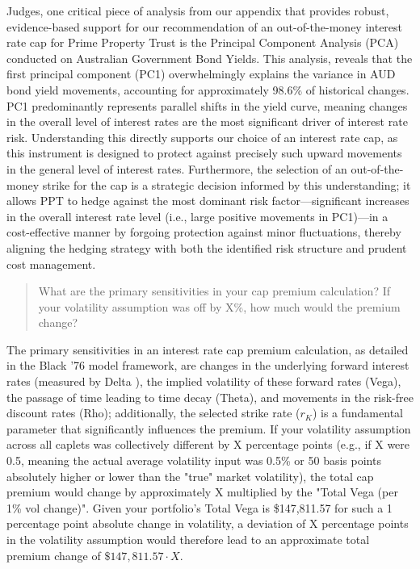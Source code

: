 \documentclass[11pt, a4paper, british]{article}
\begin{document}
Judges, one critical piece of analysis from our appendix that provides robust, evidence-based support for our recommendation of an out-of-the-money interest rate cap for Prime Property Trust is the Principal Component Analysis (PCA) conducted on Australian Government Bond Yields. This analysis, reveals that the first principal component (PC1) overwhelmingly explains the variance in AUD bond yield movements, accounting for approximately 98.6\% of historical changes. PC1 predominantly represents parallel shifts in the yield curve, meaning changes in the overall level of interest rates are the most significant driver of interest rate risk. Understanding this directly supports our choice of an interest rate cap, as this instrument is designed to protect against precisely such upward movements in the general level of interest rates. Furthermore, the selection of an out-of-the-money strike for the cap is a strategic decision informed by this understanding; it allows PPT to hedge against the most dominant risk factor—significant increases in the overall interest rate level (i.e., large positive movements in PC1)—in a cost-effective manner by forgoing protection against minor fluctuations, thereby aligning the hedging strategy with both the identified risk structure and prudent cost management.

\newpage

\begin{quote}
    What are the primary sensitivities in your cap premium calculation? If your volatility assumption was off by X\%, how much would the premium change?
\end{quote}

The primary sensitivities in an interest rate cap premium calculation, as detailed in the Black '76 model framework, are changes in the underlying forward interest rates (measured by Delta ), the implied volatility of these forward rates (Vega), the passage of time leading to time decay (Theta), and movements in the risk-free discount rates (Rho); additionally, the selected strike rate ($r_K$) is a fundamental parameter that significantly influences the premium. If your volatility assumption across all caplets was collectively different by X percentage points (e.g., if X were 0.5, meaning the actual average volatility input was 0.5\% or 50 basis points absolutely higher or lower than the "true" market volatility), the total cap premium would change by approximately X multiplied by the "Total Vega (per 1\% vol change)". Given your portfolio's Total Vega is \$147,811.57 for such a 1 percentage point absolute change in volatility, a deviation of X percentage points in the volatility assumption would therefore lead to an approximate total premium change of $\$147,811.57\cdot X$.
\end{document}
